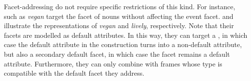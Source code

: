 \documentclass[output=paper,colorlinks,citecolor=brown,chinesefont]{langscibook}
\begin{document}
Facet-addressing  do not require specific restrictions of this kind.
For instance,  such as \emph{vegan} target the  facet of \dott{} nouns without affecting the event facet.
%
%
 and  illustrate the representations of \emph{vegan} and \emph{lively}, respectively.
Note that their facets are modelled as default attributes.
In this way, they can target a , in which case the default attribute in the  construction turns into a non-default attribute, but also a secondary default facet, in which case the facet remains a default attribute.
Furthermore, they can only combine with frames whose type is compatible with the default facet they address.
\end{document}
